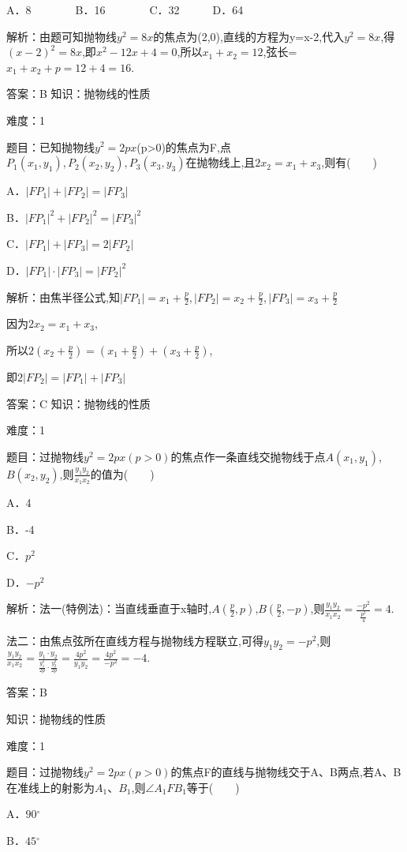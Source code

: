 \documentclass{article} %
\begin{document}
A．8　　　　B．16　　　　C．32　　　D．64

解析：由题可知抛物线$y^{2}=8x$的焦点为(2,0),直线的方程为y=x-2,代入$y^{2}=8x$,得$(x-2)^{2}=8x$,即$x^{2}-12x+4=0$,所以$x_{1}+x_{2}=12$,弦长=$x_{1}+x_{2}+p=12+4=16$.

答案：B
知识：抛物线的性质

难度：1

题目：已知抛物线$y^{2}=2px$(p>0)的焦点为F,点$P_{1}(x_{1},y_{1}),P_{2}(x_{2},y_{2}),P_{3}(x_{3},y_{3})$在抛物线上,且$2x_{2}=x_{1}+x_{3}$,则有(　　)

A．$|FP_1|+|FP_2|=|FP_3|$

B．$|FP_1|^2+|FP_2|^2=|FP_3|^2$

C．$|FP_1|+|FP_3|=2|FP_2|$

D．$|FP_1|\cdot|FP_3|=|FP_2|^2$

解析：由焦半径公式,知$|FP_1|=x_1+\frac{p}{2},|FP_2|=x_2+\frac{p}{2},|FP_3|=x_3+\frac{p}{2}$

因为$2x_{2}=x_{1}+x_{3}$,

所以$2(x_2+\frac{p}{2})=(x_1+\frac{p}{2})+(x_3+\frac{p}{2})$,

即$2|FP_2|=|FP_1|+|FP_3|$

答案：C
知识：抛物线的性质

难度：1

题目：过抛物线$y^2=2px(p>0)$的焦点作一条直线交抛物线于点$A(x_1,y_1)$,$B(x_2,y_2)$,则$\frac{y_1y_2}{x_1x_2}$的值为(　　)

A．4  

B．-4  

C．$p^2$  

D．$-p^2$

解析：法一(特例法)：当直线垂直于x轴时,$A(\frac{p}{2},p)$,$B(\frac{p}{2},-p)$,则$\frac{y_1y_2}{x_1x_2}=\frac{-p^2}{\frac{p^2}{4}}=4$.

法二：由焦点弦所在直线方程与抛物线方程联立,可得$y_1y_2=-p^2$,则$\frac{y_1y_2}{x_1x_2}=\frac{y_1\cdot y_2}{\frac{y_1^2}{2p}\cdot\frac{y_2^2}{2p}}=\frac{4p^2}{y_1y_2}=\frac{4p^2}{-p^2}=-4$.

答案：B



知识：抛物线的性质

难度：1

题目：过抛物线$y^{2}=2px(p>0)$的焦点F的直线与抛物线交于A、B两点,若A、B在准线上的射影为$A_{1}$、$B_{1}$,则${\angle}A_{1}FB_{1}$等于(　　)

A．$90{{}^\circ}$  

B．$45{{}^\circ}$  
\end{document}
